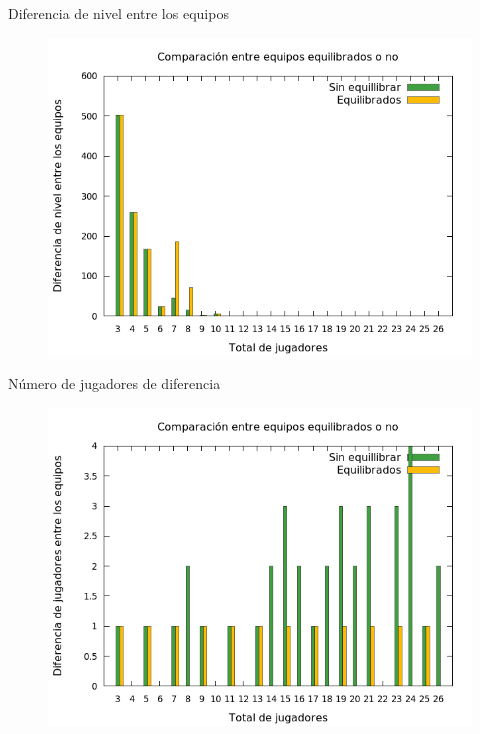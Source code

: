 \begin{frame}
	\begin{exampleblock}{Diferencia de nivel entre los equipos}
		\begin{figure}[H]
    		\centering
    		\includegraphics[scale=0.4]{../Equipos/Graficas/comparativa.png}
    		\label{fig:comparativa}
	\end{figure}
	\end{exampleblock}
\end{frame}

\begin{frame}
	\begin{exampleblock}{Número de jugadores de diferencia}
	\begin{figure}[H]
    		\centering
    		\includegraphics[scale=0.4]{../Equipos/Graficas/separacion.png}
    		\label{fig:separacion}
	\end{figure}
	\end{exampleblock}
\end{frame}

